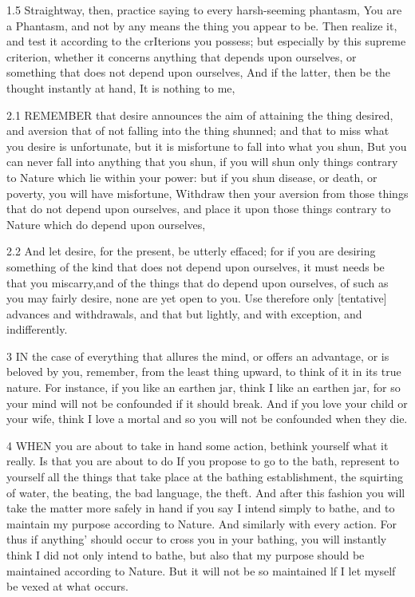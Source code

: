   1.5   Straightway, then, practice saying to every harsh-seeming phantasm, You are a Phantasm, and not by any means the thing you appear to be. Then realize it, and test it according to the crIterions you possess; but especially by this supreme criterion, whether it concerns anything that depends upon ourselves, or something that does not depend upon ourselves, And if the latter, then be the thought instantly at hand, It is nothing to me,

  2.1    REMEMBER that desire announces the aim of attaining the thing desired, and aversion that of not falling into the thing shunned; and that to miss what you desire is unfortunate, but it is misfortune to fall into what you shun, But you can never fall into anything that you shun, if you will shun only things contrary to Nature which lie within your power: but if you shun disease, or death, or poverty, you will have misfortune, Withdraw then your aversion from those things that do not depend upon ourselves, and place it upon those things contrary to Nature which do depend upon ourselves,

  2.2     And let desire, for the present, be utterly effaced; for if you are desiring something of the kind that does not depend upon ourselves, it must needs be that you miscarry,and of the things that do depend upon ourselves, of such as you may fairly desire, none are yet open to you. Use therefore only [tentative] advances and withdrawals, and that but lightly, and with exception, and indifferently.

  3    IN the case of everything that allures the mind, or offers an advantage, or is beloved by you, remember, from the least thing upward, to think of it in its true nature. For instance, if you like an earthen jar, think I like an earthen jar, for so your mind will not be confounded if it should break.  And if you love your child or your wife, think I love a mortal and so you will not be confounded when they die.

  4    WHEN you are about to take in hand some action, bethink yourself what it really. Is that you are about to do If you propose to go to the bath, represent to yourself all the things that take place at the bathing establishment, the squirting of water, the beating, the bad language, the theft. And after this fashion you will take the matter more safely in hand if you say I intend simply to bathe, and to maintain my purpose according to Nature. And similarly with every action. For thus if anything’ should occur to cross you in your bathing, you will instantly think I did not only intend to bathe, but also that my purpose should be maintained according to Nature. But it will not be so maintained lf I let myself be vexed at what occurs.

